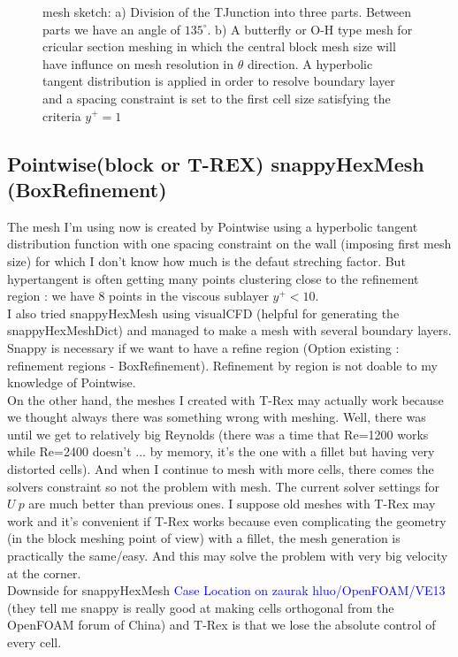 \documentclass[a4paper,10pt]{article}
\begin{document}
{\begin{figure}
\caption{mesh sketch: a) Division of the TJunction into three parts. Between parts we have an angle of $135^\circ$. b) A butterfly or O-H type mesh for cricular section meshing in which the central block mesh size will have influnce on mesh resolution in $\theta$ direction. A hyperbolic tangent distribution is applied in order to resolve boundary layer and a spacing constraint is set to the first cell size satisfying the criteria $y^+=1$} \label{mesh_sketch}
\end{figure}
}

\subsection{Pointwise(block or T-REX) snappyHexMesh (BoxRefinement)}

The mesh I'm using now is created by Pointwise using a hyperbolic tangent distribution function with one spacing constraint on the wall (imposing first mesh size) for which I don't know how much is the defaut streching factor. But hypertangent is often getting many points clustering close to the refinement region : we have 8 points in the viscous sublayer $y^+ < 10$.\\

I also tried snappyHexMesh using visualCFD (helpful for generating the snappyHexMeshDict) and managed to make a mesh with several boundary layers. Snappy is necessary if we want to have a refine region (Option existing : refinement regions - BoxRefinement). Refinement by region is not doable to my knowledge of Pointwise. \\

On the other hand, the meshes I created with T-Rex may actually work because we thought always there was something wrong with meshing. Well, there was until we get to relatively big Reynolds (there was a time that Re=1200 works while Re=2400 doesn't ... by memory, it's the one with a fillet but having very distorted cells). And when I continue to mesh with more cells, there comes the solvers constraint so not the problem with mesh. The current solver settings for $U\ p$ are much better than previous ones. I suppose old meshes with T-Rex may work and it's convenient if T-Rex works because even complicating the geometry (in the block meshing point of view) with a fillet, the mesh generation is practically the same/easy. And this may solve the problem with very big velocity at the corner. \\

Downside for snappyHexMesh \textcolor{blue}{Case Location on zaurak hluo/OpenFOAM/VE13} (they tell me snappy is really good at making cells orthogonal from the OpenFOAM forum of China) and T-Rex is that we lose the absolute control of every cell.  
\end{document}
